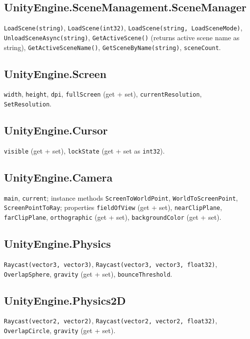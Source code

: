 \documentclass[11pt,a4paper]{article}
\newcommand{\code}[1]{\texttt{\small #1}}
\begin{document}
\subsection{UnityEngine.SceneManagement.SceneManager}

\code{LoadScene(string)}, \code{LoadScene(int32)},
\code{LoadScene(string, LoadSceneMode)},
\code{UnloadSceneAsync(string)},
\code{GetActiveScene()} (returns active scene name as string),
\code{GetActiveSceneName()}, \code{GetSceneByName(string)},
\code{sceneCount}.

\subsection{UnityEngine.Screen}

\code{width}, \code{height}, \code{dpi}, \code{fullScreen} (get + set),
\code{currentResolution}, \code{SetResolution}.

\subsection{UnityEngine.Cursor}

\code{visible} (get + set), \code{lockState} (get + set as \code{int32}).

\subsection{UnityEngine.Camera}

\code{main}, \code{current}; instance methods \code{ScreenToWorldPoint},
\code{WorldToScreenPoint}, \code{ScreenPointToRay}; properties
\code{fieldOfView} (get + set), \code{nearClipPlane}, \code{farClipPlane},
\code{orthographic} (get + set), \code{backgroundColor} (get + set).

\subsection{UnityEngine.Physics}

\code{Raycast(vector3, vector3)},
\code{Raycast(vector3, vector3, float32)},
\code{OverlapSphere}, \code{gravity} (get + set),
\code{bounceThreshold}.

\subsection{UnityEngine.Physics2D}

\code{Raycast(vector2, vector2)},
\code{Raycast(vector2, vector2, float32)},
\code{OverlapCircle}, \code{gravity} (get + set).
\end{document}
